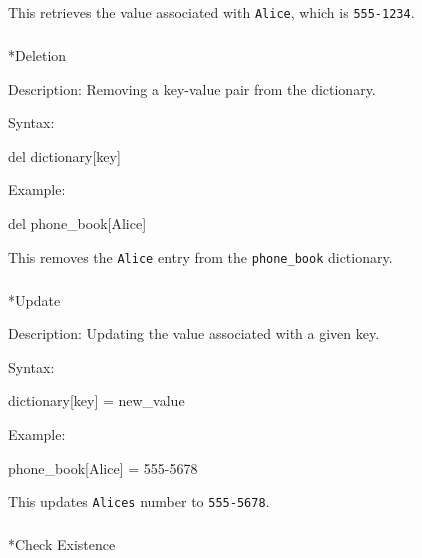 \documentclass[
  letterpaper,
  DIV=11,
  numbers=noendperiod]{scrreprt}
\makeatletter
\let\oldsubparagraph\subparagraph
\renewcommand{\subparagraph}{
    \@ifstar
      \xxxSubParagraphStar
      \xxxSubParagraphNoStar
  }
\newcommand{\xxxSubParagraphStar}[1]{\oldsubparagraph*{#1}\mbox{}}
\newcommand{\xxxSubParagraphNoStar}[1]{\oldsubparagraph{#1}\mbox{}}
\newenvironment{Shaded}{\begin{snugshade}}{\end{snugshade}}
\newcommand{\NormalTok}[1]{\textcolor[rgb]{0.00,0.23,0.31}{#1}}
\makeatother
\begin{document}
This retrieves the value associated with
\texttt{\textquotesingle{}Alice\textquotesingle{}}, which is
\texttt{\textquotesingle{}555-1234\textquotesingle{}}.

\subparagraph*{Deletion}\label{deletion}

Description: Removing a key-value pair from the dictionary.

Syntax:

\begin{Shaded}
\begin{Highlighting}[]
\NormalTok{del dictionary[key]}
\end{Highlighting}
\end{Shaded}

Example:

\begin{Shaded}
\begin{Highlighting}[]
\NormalTok{del phone\_book[\textquotesingle{}Alice\textquotesingle{}]}
\end{Highlighting}
\end{Shaded}

This removes the \texttt{\textquotesingle{}Alice\textquotesingle{}}
entry from the \texttt{phone\_book} dictionary.

\subparagraph*{Update}\label{update}

Description: Updating the value associated with a given key.

Syntax:

\begin{Shaded}
\begin{Highlighting}[]
\NormalTok{dictionary[key] = new\_value}
\end{Highlighting}
\end{Shaded}

Example:

\begin{Shaded}
\begin{Highlighting}[]
\NormalTok{phone\_book[\textquotesingle{}Alice\textquotesingle{}] = \textquotesingle{}555{-}5678\textquotesingle{}}
\end{Highlighting}
\end{Shaded}

This updates \texttt{\textquotesingle{}Alice\textquotesingle{}s} number
to \texttt{\textquotesingle{}555-5678\textquotesingle{}}.

\subparagraph*{Check Existence}\label{check-existence}
\end{document}
